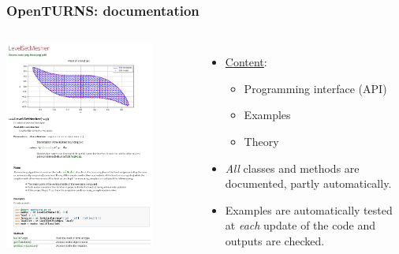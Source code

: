 \documentclass{beamer}
\begin{document}
\begin{frame}[containsverbatim]
  \frametitle{OpenTURNS: documentation}
  
  \small{
  
  \begin{columns}
  
      \begin{center}
      \includegraphics[width=0.8\textwidth]{figures/exClasses.png}
      \end{center}
  
  
    \begin{itemize}
    \item \underline{Content}: 
    \begin{itemize}
    \item Programming interface (API)
    \item Examples
    \item Theory
    \end{itemize}
    \item \emph{All} classes and methods 
    are documented, partly automatically.
    \item Examples are automatically tested at \emph{each} update 
    of the code and outputs are checked.
    \end{itemize}
    
  \end{columns}
  
  }
\end{frame}
  
\end{document}
